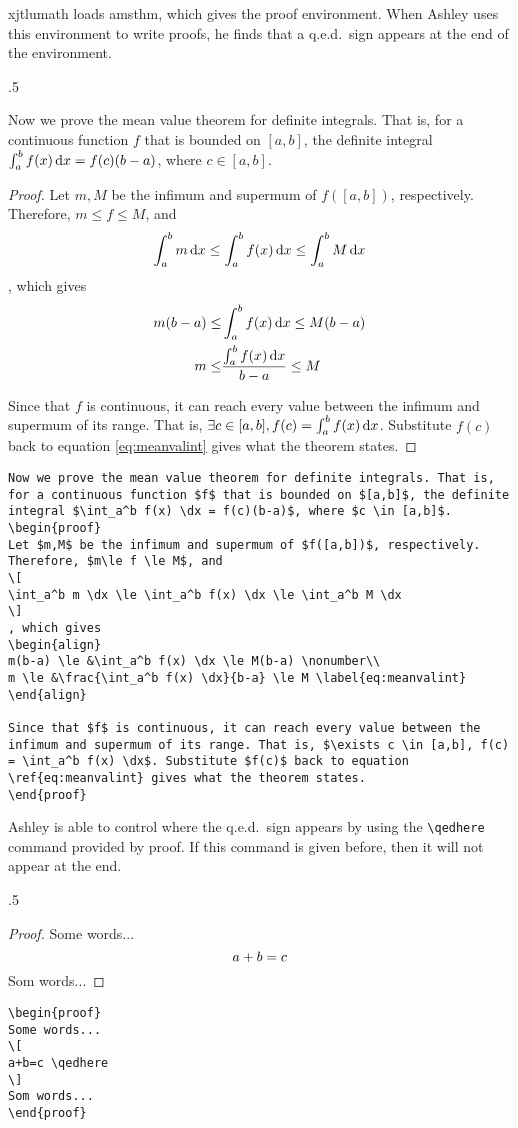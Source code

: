 xjtlumath loads amsthm, which gives the proof environment. When Ashley uses this environment to write proofs, he finds that a q.e.d.~sign appears at the end of the environment.
\begin{miniexammar}{.5\textandmarginlen}{
Now we prove the mean value theorem for definite integrals. That is, for a continuous function $f$ that is bounded on $[a,b]$, the definite integral $\int_a^b f(x) \,\mathrm{d} x = f(c)(b-a)$, where $c \in [a,b]$. 
\begin{proof}
Let $m,M$ be the infimum and supermum of $f([a,b])$, respectively.
Therefore, $m\le f \le M$, and
\[
\int_a^b m \,\mathrm{d} x \le \int_a^b f(x) \,\mathrm{d} x \le \int_a^b M \,\mathrm{d} x
\]
, which gives
\begin{align}
m(b-a) \le &\int_a^b f(x) \,\mathrm{d} x \le M(b-a) \nonumber\\
m \le &\frac{\int_a^b f(x) \,\mathrm{d} x}{b-a} \le M \label{eq:meanvalint}
\end{align}

Since that $f$ is continuous, it can reach every value between the infimum and supermum of its range. That is, $\exists c \in [a,b], f(c) = \int_a^b f(x) \,\mathrm{d} x$. Substitute $f(c)$ back to equation \ref{eq:meanvalint} gives what the theorem states.
\end{proof}
}
\begin{lstlisting}[basicstyle=\footnotesize]
Now we prove the mean value theorem for definite integrals. That is, for a continuous function $f$ that is bounded on $[a,b]$, the definite integral $\int_a^b f(x) \dx = f(c)(b-a)$, where $c \in [a,b]$. 
\begin{proof}
Let $m,M$ be the infimum and supermum of $f([a,b])$, respectively.
Therefore, $m\le f \le M$, and
\[
\int_a^b m \dx \le \int_a^b f(x) \dx \le \int_a^b M \dx
\]
, which gives
\begin{align}
m(b-a) \le &\int_a^b f(x) \dx \le M(b-a) \nonumber\\
m \le &\frac{\int_a^b f(x) \dx}{b-a} \le M \label{eq:meanvalint}
\end{align}

Since that $f$ is continuous, it can reach every value between the infimum and supermum of its range. That is, $\exists c \in [a,b], f(c) = \int_a^b f(x) \dx$. Substitute $f(c)$ back to equation \ref{eq:meanvalint} gives what the theorem states.
\end{proof}
\end{lstlisting}
\end{miniexammar}

Ashley is able to control where the q.e.d.~sign appears by using the \verb=\qedhere= command provided by proof. If this command is given before, then it will not appear at the end.
\begin{miniexammar}{.5\textandmarginlen}{
\begin{proof}
Some words...
\[
a+b=c \qedhere
\]
Som words...
\end{proof}
}
\begin{lstlisting}
\begin{proof}
Some words...
\[
a+b=c \qedhere
\]
Som words...
\end{proof}
\end{lstlisting}
\end{miniexammar}

